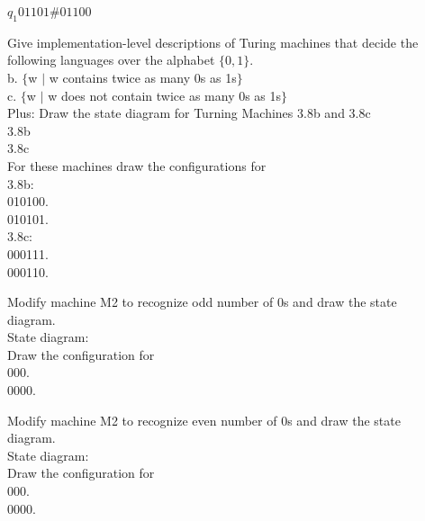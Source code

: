 \documentclass[12pt]{article}
\begin{document}
$q_1 01101\#01100$ \\




\pagebreak

Give implementation-level descriptions of Turing machines that decide the following
languages over the alphabet $\{0,1\}$. \\

b. $\{$w $\mid$ w contains twice as many 0s as 1s$\}$ \\

c. $\{$w $\mid$ w does not contain twice as many 0s as 1s$\}$ \\

Plus: Draw the state diagram for Turning Machines 3.8b and 3.8c \\
3.8b \\

3.8c \\

For these machines draw the configurations for \\
3.8b: \\
010100. \\

010101. \\

3.8c: \\
000111. \\

000110. \\


\pagebreak

Modify machine M2 to recognize odd number of 0s and draw the state \\
diagram. \\

State diagram: \\

Draw the configuration for \\
000. \\

0000. \\

\pagebreak

Modify machine M2 to recognize even number of 0s and draw the state \\
diagram. \\

State diagram: \\

Draw the configuration for \\
000. \\

0000. \\
\end{document}

